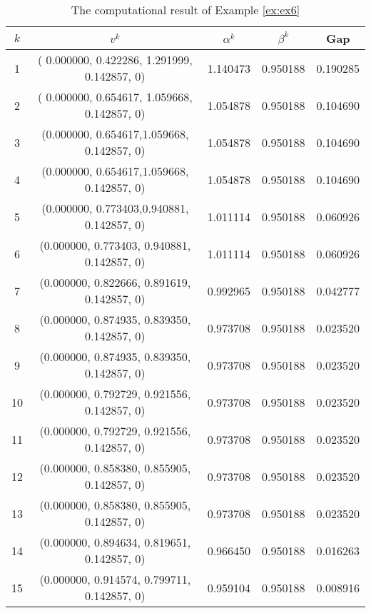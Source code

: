 \begin{table}[h]
\centering{}\caption{\label{tab:ex6}The computational result of Example \ref{ex:ex6}}
\begin{centering}
\begin{tabular}{ccccc}
\hline 
$k$ & $v^{k}$ & $\alpha^{k}$ & $\beta^{k}$ & Gap\tabularnewline
\hline 
\hline 
1 & ( 0.000000, 0.422286, 1.291999,  0.142857, 0) & 1.140473 & 0.950188 & 0.190285 \tabularnewline
\hline 
2 & ( 0.000000, 0.654617, 1.059668, 0.142857, 0) & 1.054878 & 0.950188 & 0.104690 \tabularnewline
\hline 
3 & (0.000000, 0.654617,1.059668, 0.142857, 0) & 1.054878 & 0.950188 & 0.104690 \tabularnewline
\hline 
4 & (0.000000, 0.654617,1.059668, 0.142857, 0) & 1.054878 & 0.950188 & 0.104690 \tabularnewline
\hline 
5 & (0.000000, 0.773403,0.940881, 0.142857, 0) & 1.011114 & 0.950188 & 0.060926 \tabularnewline
\hline
6 & (0.000000, 0.773403, 0.940881, 0.142857, 0) & 1.011114 & 0.950188 & 0.060926 \tabularnewline
\hline
7 & (0.000000, 0.822666, 0.891619, 0.142857, 0) & 0.992965 & 0.950188 & 0.042777 \tabularnewline
\hline
8 & (0.000000, 0.874935, 0.839350, 0.142857, 0) & 0.973708 & 0.950188 & 0.023520 \tabularnewline
\hline
9 & (0.000000, 0.874935, 0.839350, 0.142857, 0) & 0.973708 & 0.950188 & 0.023520 \tabularnewline
\hline
10 & (0.000000, 0.792729, 0.921556, 0.142857, 0) & 0.973708 & 0.950188 & 0.023520 \tabularnewline
\hline
11 & (0.000000, 0.792729, 0.921556, 0.142857, 0) & 0.973708 & 0.950188 & 0.023520 \tabularnewline
\hline
12 & (0.000000, 0.858380, 0.855905, 0.142857, 0) & 0.973708 & 0.950188 & 0.023520 \tabularnewline
\hline
13 & (0.000000, 0.858380, 0.855905, 0.142857, 0) & 0.973708 & 0.950188 & 0.023520 \tabularnewline
\hline
14 & (0.000000, 0.894634, 0.819651, 0.142857, 0) & 0.966450 & 0.950188 & 0.016263 \tabularnewline
\hline
15 & (0.000000, 0.914574, 0.799711, 0.142857, 0) & 0.959104 & 0.950188 & 0.008916 \tabularnewline
\hline
\end{tabular}
\par\end{centering}
\end{table}

